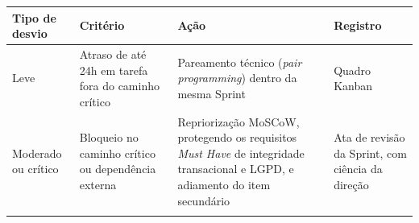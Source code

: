 {\footnotesize
\begin{tabularx}{\textwidth}{>{\hsize=0.523\hsize\sloppy\arraybackslash}X >{\hsize=1.041\hsize\sloppy\arraybackslash}X >{\hsize=1.807\hsize\sloppy\arraybackslash}X >{\hsize=0.629\hsize\sloppy\arraybackslash}X}
\arrayrulecolor{GithubTableBorder}\toprule
\rowcolor{BrandTableHeader}
\textbf{Tipo de desvio} & \textbf{Critério} & \textbf{Ação} & \textbf{Registro} \\
\midrule
\arrayrulecolor{BrandGrayRule}
Leve & Atraso de até 24h em tarefa fora do caminho crítico & Pareamento técnico (\emph{pair programming}) dentro da mesma Sprint & Quadro Kanban \\
\midrule
Moderado ou crítico & Bloqueio no caminho crítico ou dependência externa & Repriorização MoSCoW, protegendo os requisitos \emph{Must Have} de integridade transacional e LGPD, e adiamento do item secundário & Ata de revisão da Sprint, com ciência da direção \\
\arrayrulecolor{GithubTableBorder}\bottomrule
\end{tabularx}%
}
